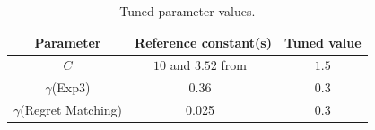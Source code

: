 \documentclass{article}
\begin{document}
\begin{table}[h!]
\begin{minipage}{.4\textwidth}
\begin{tabular}{|c||c|c|}
							\hline
Parameter			& Reference constant(s)                             & Tuned value	\\ \hline\hline
    $C$				& $10$ and $3.52$ from~\cite{teuling_tron,cig_paper}	& $1.5$		\\ \hline
$\gamma$(Exp3) & 0.36~\cite{cig_paper}		& 0.3		\\ \hline
$\gamma$(Regret Matching)	& 0.025~\cite{mcts_goofspiel}				& 0.3		\\ \hline
\end{tabular}
\caption{Tuned parameter values. \label{tbl:tunedvals} }
\end{minipage}
\end{table}
\end{document}
